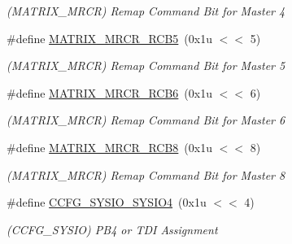 \begin{DoxyCompactItemize}
\begin{DoxyCompactList}\small\item\em (M\+A\+T\+R\+I\+X\+\_\+\+M\+R\+CR) Remap Command Bit for Master 4 \end{DoxyCompactList}\item 
\mbox{\label{group__SAMS70__MATRIX_ga6cd4d938e52347adefdb0a875206d229}} 
\#define \mbox{\hyperlink{group__SAMS70__MATRIX_ga6cd4d938e52347adefdb0a875206d229}{M\+A\+T\+R\+I\+X\+\_\+\+M\+R\+C\+R\+\_\+\+R\+C\+B5}}~(0x1u $<$$<$ 5)
\begin{DoxyCompactList}\small\item\em (M\+A\+T\+R\+I\+X\+\_\+\+M\+R\+CR) Remap Command Bit for Master 5 \end{DoxyCompactList}\item 
\mbox{\label{group__SAMS70__MATRIX_ga8fd30af2c60b0722e6448e99b793d0d6}} 
\#define \mbox{\hyperlink{group__SAMS70__MATRIX_ga8fd30af2c60b0722e6448e99b793d0d6}{M\+A\+T\+R\+I\+X\+\_\+\+M\+R\+C\+R\+\_\+\+R\+C\+B6}}~(0x1u $<$$<$ 6)
\begin{DoxyCompactList}\small\item\em (M\+A\+T\+R\+I\+X\+\_\+\+M\+R\+CR) Remap Command Bit for Master 6 \end{DoxyCompactList}\item 
\mbox{\label{group__SAMS70__MATRIX_gad0bf8066b69cd6cd777ff6b5117ef108}} 
\#define \mbox{\hyperlink{group__SAMS70__MATRIX_gad0bf8066b69cd6cd777ff6b5117ef108}{M\+A\+T\+R\+I\+X\+\_\+\+M\+R\+C\+R\+\_\+\+R\+C\+B8}}~(0x1u $<$$<$ 8)
\begin{DoxyCompactList}\small\item\em (M\+A\+T\+R\+I\+X\+\_\+\+M\+R\+CR) Remap Command Bit for Master 8 \end{DoxyCompactList}\item 
\mbox{\label{group__SAMS70__MATRIX_ga59a09a374bab5cbed270d5aace8082bc}} 
\#define \mbox{\hyperlink{group__SAMS70__MATRIX_ga59a09a374bab5cbed270d5aace8082bc}{C\+C\+F\+G\+\_\+\+S\+Y\+S\+I\+O\+\_\+\+S\+Y\+S\+I\+O4}}~(0x1u $<$$<$ 4)
\begin{DoxyCompactList}\small\item\em (C\+C\+F\+G\+\_\+\+S\+Y\+S\+IO) P\+B4 or T\+DI Assignment \end{DoxyCompactList}\item 

\end{DoxyCompactItemize}
